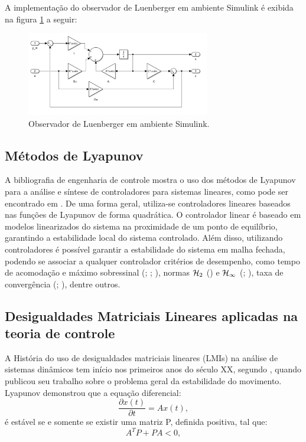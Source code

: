 A implementação do observador de Luenberger em ambiente Simulink é exibida na figura \ref{fig:luemberger_simulink} a seguir:

\FloatBarrier
\begin{figure}[htbp]
    \begin{centering}
        \includegraphics[width=8cm]{img/luenberger_simulink.png}
        \caption{Observador de Luenberger em ambiente Simulink.} 
        \label{fig:luemberger_simulink}
    \end{centering}
\end{figure}
\FloatBarrier

\subsection{Métodos de Lyapunov}
A bibliografia de engenharia de controle mostra o uso dos métodos de Lyapunov para a análise e síntese de controladores para sistemas lineares, como pode ser encontrado em \cite{ChenLSTI}. De uma forma geral, utiliza-se controladores lineares baseados nas funções de Lyapunov de forma quadrática. O controlador linear é baseado em modelos linearizados do sistema na proximidade de um ponto de equilíbrio, garantindo a estabilidade local do sistema controlado. Além disso, utilizando controladores é possível garantir a estabilidade do sistema em malha fechada, podendo se associar a qualquer controlador critérios de desempenho, como tempo de acomodação e máximo sobressinal (\cite{Hang1987RefinementsOT}; \cite{601347}; \cite{1049598}), normas $\mathcal{H}_2$ (\cite{4789992}) e $\mathcal{H}_\infty$ (\cite{Petersen}; \cite{Wang1992RobustCO}), taxa de convergência (\cite{Elia2001StabilizationInformation}; \cite{LORIA200213}), dentre outros.

\subsection{Desigualdades Matriciais Lineares aplicadas na teoria de controle}
A História do uso de desigualdades matriciais lineares (LMIs) na análise de sistemas dinâmicos tem início nos primeiros anos do século XX, segundo \cite{Boyd1994LinearTheory}, quando \cite{Lyapunov1992TheMotion} publicou seu trabalho sobre o problema geral da estabilidade do movimento. Lyapunov demonstrou que a equação diferencial:
\begin{equation} \label{eq:lyapunovdif}
    \frac{\partial x(t)}{\partial t} = Ax(t), 
\end{equation}
é estável se e somente se existir uma matriz P, definida positiva, tal que:
\begin{equation} \label{eq:lyapunovlmi}
    A^{T}P + PA < 0,
\end{equation}
        
